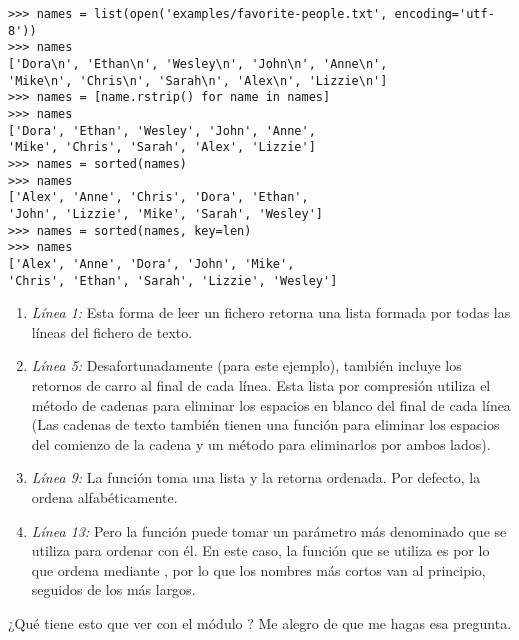 \noindent\begin{minipage}{\textwidth}
\begin{lstlisting}[mathescape=True]
>>> names = list(open('examples/favorite-people.txt', encoding='utf-8'))
>>> names
['Dora\n', 'Ethan\n', 'Wesley\n', 'John\n', 'Anne\n',
'Mike\n', 'Chris\n', 'Sarah\n', 'Alex\n', 'Lizzie\n']
>>> names = [name.rstrip() for name in names]
>>> names
['Dora', 'Ethan', 'Wesley', 'John', 'Anne',
'Mike', 'Chris', 'Sarah', 'Alex', 'Lizzie']
>>> names = sorted(names)
>>> names
['Alex', 'Anne', 'Chris', 'Dora', 'Ethan',
'John', 'Lizzie', 'Mike', 'Sarah', 'Wesley']
>>> names = sorted(names, key=len)
>>> names
['Alex', 'Anne', 'Dora', 'John', 'Mike',
'Chris', 'Ethan', 'Sarah', 'Lizzie', 'Wesley']
\end{lstlisting}
\end{minipage}

\begin{enumerate}

\item \emph{Línea 1:} Esta forma de leer un fichero retorna una lista formada por todas las líneas del fichero de texto.

\item \emph{Línea 5:} Desafortunadamente (para este ejemplo), también incluye los retornos de carro al final de cada línea. Esta lista por compresión utiliza el método de cadenas  para eliminar los espacios en blanco del final de cada línea (Las cadenas de texto también tienen una función  para eliminar los espacios del comienzo de la cadena y un método  para eliminarlos por ambos lados).

\item \emph{Línea 9:} La función  toma una lista y la retorna ordenada. Por defecto, la ordena alfabéticamente.

\item \emph{Línea 13:} Pero la función  puede tomar un parámetro más denominado  que se utiliza para ordenar con él. En este caso, la función que se utiliza es  por lo que ordena mediante , por lo que los nombres más cortos van al principio, seguidos de los más largos.

\end{enumerate}

¿Qué tiene esto que ver con el módulo ? Me alegro de que me hagas esa pregunta.

